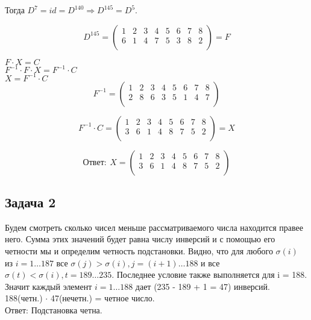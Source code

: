 	  Тогда $D^{7} = id = D^{140} \Rightarrow D^{145} = D^{5}$.
	  
	   \[
	   D^{145}=
	  \begin{pmatrix}
	  1 & 2 & 3 & 4 & 5 & 6 & 7 & 8 \\
	  6 & 1 & 4 & 7 & 5 & 3 & 8 & 2 \\
	  \end{pmatrix} = F
	  \]
	   
	   $F \cdot X = C$\\
	   $F^{-1} \cdot F \cdot X = F^{-1} \cdot C$\\
	   $X = F^{-1} \cdot C$\\
	   
	   \[
	   F^{-1}=
	   \begin{pmatrix}
	   1 & 2 & 3 & 4 & 5 & 6 & 7 & 8 \\
	   2 & 8 & 6 & 3 & 5 & 1 & 4 & 7 \\
	   \end{pmatrix}
	   \]
	   
	   \[
	   F^{-1} \cdot C=
	   \begin{pmatrix}
	   1 & 2 & 3 & 4 & 5 & 6 & 7 & 8 \\
	   3 & 6 & 1 & 4 & 8 & 7 & 5 & 2 \\
	   \end{pmatrix} = X
	   \]
	   
	   \[
	   Ответ: \ X=
	   \begin{pmatrix}
	   1 & 2 & 3 & 4 & 5 & 6 & 7 & 8 \\
	   3 & 6 & 1 & 4 & 8 & 7 & 5 & 2 \\
	   \end{pmatrix}
	   \]
	   
	   \subsection{Задача 2} 
	   Будем смотреть сколько чисел меньше рассматриваемого числа находится правее него. Сумма этих значений будет равна числу инверсий и с помощью его четности мы и определим четность подстановки.
	   Видно, что для любого $\sigma(i)$ из $i = 1 \dots 187$ все $\sigma(j) > \sigma(i), j = (i + 1) \dots 188$ и все $\sigma(t) < \sigma(i), t=189 \dots 235$. Последнее условие также выполняется для i = 188.\\
	   Значит каждый элемент $i = 1 \dots 188$ дает (235 - 189 + 1 = 47) инверсий.\\
	   188(четн.) $\cdot$ 47(нечетн.) = четное число. \\
	   Ответ: Подстановка четна.
	   
